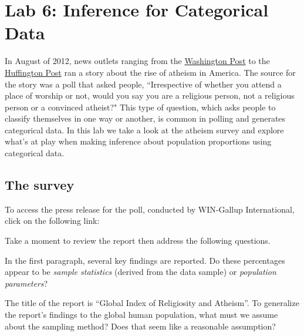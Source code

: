 \documentclass{article}\usepackage[]{graphicx}\usepackage[]{color}
\begin{document}
\section*{Lab 6: Inference for Categorical Data}

%

In August of 2012, news outlets ranging from the \href{http://www.washingtonpost.com/national/on-faith/poll-shows-atheism-on-the-rise-in-the-us/2012/08/13/90020fd6-e57d-11e1-9739-eef99c5fb285_story.html}{Washington Post} to the \href{http://www.huffingtonpost.com/2012/08/14/atheism-rise-religiosity-decline-in-america_n_1777031.html}{Huffington Post} ran a story about the rise of atheism in America. The source for the story was a poll that asked people, ``Irrespective of whether you attend a place of worship or not, would you say you are a religious person, not a religious person or a convinced atheist?"  This type of question, which asks people to classify themselves in one way or another, is common in polling and generates categorical data. In this lab we take a look at the atheism survey and explore what's at play when making inference about population proportions using categorical data.

%

\subsection*{The survey}
To access the press release for the poll, conducted by WIN-Gallup International, click on the following link:


Take a moment to review the report then address the following questions.

\begin{exercise}
In the first paragraph, several key findings are reported. Do these percentages appear to be \emph{sample statistics} (derived from the data sample) or \emph{population parameters}?
\label{exstats}
\end{exercise}

\begin{exercise}
The title of the report is ``Global Index of Religiosity and Atheism''. To generalize the report's findings to the global human population,  what must we assume about the sampling method? Does that seem like a reasonable assumption?
\end{exercise}
\end{document}
